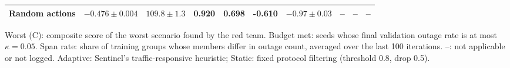 \begin{table}[!htbp]
{\begin{tabular}{@{}lccccccccc@{}}
Random actions & $-0.476\pm0.004$ & $109.8\pm1.3$ & 0.920 & 0.698 & -0.610 & $-0.97\pm0.03$ & -- & -- & -- \\
\bottomrule
\end{tabular}}
\vspace{2pt}
\parbox{\textwidth}{\footnotesize Worst (C): composite score of the worst scenario found by the red team. Budget met: seeds whose final validation outage rate is at most $\kappa=0.05$. Span rate: share of training groups whose members differ in outage count, averaged over the last 100 iterations. --: not applicable or not logged. Adaptive: Sentinel's traffic-responsive heuristic; Static: fixed protocol filtering (threshold 0.8, drop 0.5).}
\end{table}
